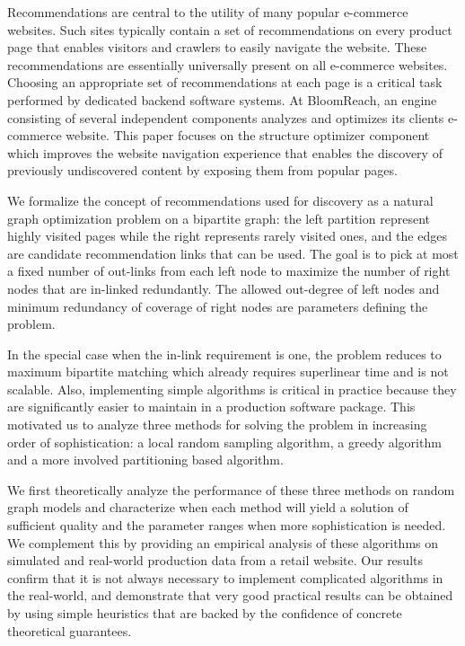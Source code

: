 \abstract


Recommendations are central to the utility of many popular e-commerce
websites. Such sites typically contain a set of recommendations on
every product page that enables visitors and crawlers to easily
navigate the website.  These recommendations are essentially universally present
on all e-commerce websites. Choosing an appropriate set of recommendations
at each page is a critical task performed by dedicated backend
software systems.  At BloomReach, an engine consisting of several independent components
analyzes and optimizes its clients e-commerce website. This paper
focuses on the structure optimizer component which improves the
website navigation experience that enables the discovery of previously
undiscovered content by exposing them from popular pages.\vs


We formalize the concept of recommendations used for discovery as a natural graph optimization
problem on a bipartite graph: the left partition represent highly visited pages while the right 
represents rarely visited ones, and the edges are candidate recommendation links that can be used. 
The goal is to pick at most a fixed number of out-links from each left node to maximize the number of 
right nodes that are in-linked redundantly. The allowed out-degree of left nodes and minimum redundancy
 of coverage of right nodes are parameters defining the problem.

In the special case when the in-link requirement is one, the problem reduces to maximum bipartite 
matching which already requires superlinear time and is not scalable. Also, implementing simple
algorithms is critical in practice because they are significantly
easier to maintain in a production software package. This motivated us
to analyze three methods for solving the problem in increasing order
of sophistication: a local random sampling algorithm, a greedy algorithm
and a more involved partitioning based algorithm. \vs

We first theoretically analyze the performance of these three methods
on random graph models and characterize when each method will yield a
solution of sufficient quality and the parameter ranges when more
sophistication is needed. We complement this by providing an empirical
analysis of these algorithms on simulated and real-world production
data from a retail website. Our results confirm that it is not always necessary to implement  complicated algorithms in the real-world, and
demonstrate that very good practical results can be obtained by
using simple heuristics that are backed by the confidence of concrete
theoretical guarantees. \vs

